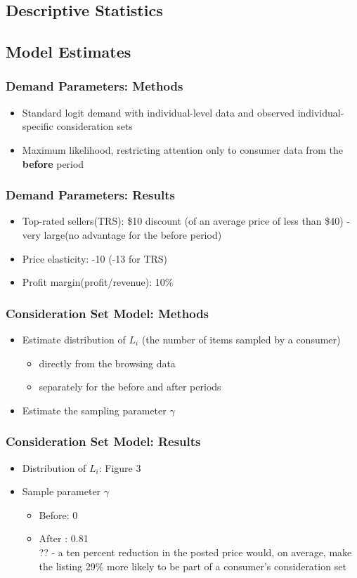 \documentclass{beamer}
\begin{document}
\subsection{Descriptive Statistics}

\subsection{Model Estimates}
\begin{frame}
\frametitle{Demand Parameters: Methods}
\begin{itemize}
\item Standard logit demand with individual-level data and observed individual-specific consideration sets
\item Maximum likelihood, restricting attention only to consumer data from the \textbf{before} period
\end{itemize}
\end{frame}

\begin{frame}
\frametitle{Demand Parameters: Results}
\begin{itemize}
\item Top-rated sellers(TRS): \$10 discount (of an average price of less than \$40) - very large(no advantage for the before period)
\item Price elasticity: -10 (-13 for TRS)
\item Profit margin(profit/revenue): 10\%
\end{itemize}
\end{frame}

\begin{frame}
\frametitle{Consideration Set Model: Methods}
\begin{itemize}
\item Estimate distribution of $L_i$ (the number of items sampled by a consumer) 
\begin{itemize}
\item directly from the browsing data
\item separately for the before and after periods
\end{itemize}
\item Estimate the sampling parameter $\gamma$
\end{itemize}
\end{frame}

\begin{frame}
\frametitle{Consideration Set Model: Results}
\begin{itemize}
\item Distribution of $L_i$: Figure 3
\item Sample parameter $\gamma$
  \begin{itemize}
  \item Before: 0 
  \item After : 0.81 \\?? - a ten percent reduction in the posted price would, on average, make the listing 29\% more likely to be part of a consumer's consideration set
  \end{itemize}
\end{itemize}
\end{frame}
\end{document}
